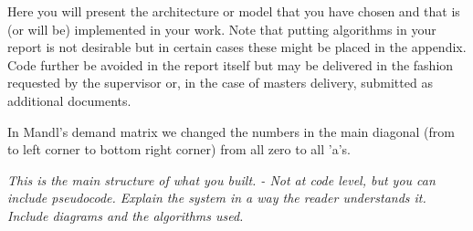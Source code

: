 Here you will present the architecture or model that you have chosen and that is (or will be) implemented in your work. Note that putting algorithms in your report is not desirable but in certain cases these might be placed in the appendix. Code further be avoided in the report itself but may be delivered in the fashion requested by the supervisor or, in the case of masters delivery, submitted as additional documents. 

In Mandl's demand matrix we changed the numbers in the main diagonal (from to left corner to bottom right corner) from all zero to all 'a's. 

\textit{This is the main structure of what you built.
- Not at code level, but you can include pseudocode.
Explain the system in a way the reader understands it.
Include diagrams and the algorithms used.}

\par


